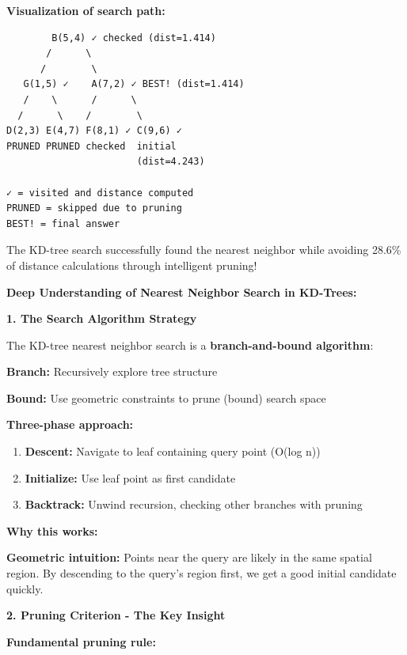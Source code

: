 \documentclass[12pt]{article}
\begin{document}
\begin{solution}
\textbf{Visualization of search path:}

\begin{verbatim}
        B(5,4) ✓ checked (dist=1.414)
       /      \
      /        \
   G(1,5) ✓    A(7,2) ✓ BEST! (dist=1.414)
   /    \      /      \
  /      \    /        \
D(2,3) E(4,7) F(8,1) ✓ C(9,6) ✓
PRUNED PRUNED checked  initial
                       (dist=4.243)

✓ = visited and distance computed
PRUNED = skipped due to pruning
BEST! = final answer
\end{verbatim}

The KD-tree search successfully found the nearest neighbor while avoiding 28.6\% of distance calculations through intelligent pruning!
\end{solution}

\begin{explanation}
\textbf{Deep Understanding of Nearest Neighbor Search in KD-Trees:}

\textbf{1. The Search Algorithm Strategy}

The KD-tree nearest neighbor search is a \textbf{branch-and-bound algorithm}:

\textbf{Branch:} Recursively explore tree structure

\textbf{Bound:} Use geometric constraints to prune (bound) search space

\textbf{Three-phase approach:}
\begin{enumerate}
    \item \textbf{Descent:} Navigate to leaf containing query point (O(log n))
    \item \textbf{Initialize:} Use leaf point as first candidate
    \item \textbf{Backtrack:} Unwind recursion, checking other branches with pruning
\end{enumerate}

\textbf{Why this works:}

\textbf{Geometric intuition:} Points near the query are likely in the same spatial region. By descending to the query's region first, we get a good initial candidate quickly.

\textbf{2. Pruning Criterion - The Key Insight}

\textbf{Fundamental pruning rule:}

\begin{center}
\end{center}
\end{explanation}
\end{document}
